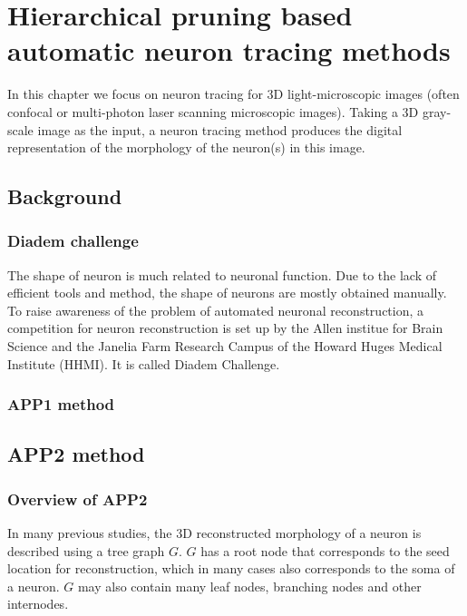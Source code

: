 \chapter{Hierarchical pruning based automatic neuron tracing methods} \label{chpt:auto-nt}
In this chapter we focus on neuron tracing for 3D light-microscopic images (often confocal or multi-photon laser scanning microscopic images). Taking a 3D gray-scale image as the input, a neuron tracing method produces the digital representation of the morphology of the neuron(s) in this image.

\section{Background}
\subsection{Diadem challenge}
The shape of neuron is much related to neuronal function. Due to the lack of efficient tools and method, the shape of neurons are mostly obtained manually. To raise awareness of the problem of automated neuronal reconstruction, a competition for neuron reconstruction is set up by the Allen institue for Brain Science and the Janelia Farm Research Campus of the Howard Huges Medical Institute (HHMI). It is called Diadem Challenge.
\subsection{APP1 method}
\section{APP2 method}
\subsection{Overview of APP2}
In many previous studies, the 3D reconstructed morphology of a neuron is described using a tree graph $G$.  $G$ has a root node that corresponds to the seed location for reconstruction, which in many cases also corresponds to the soma of a neuron. $G$ may also contain many leaf nodes, branching nodes and other internodes.

